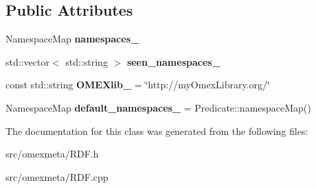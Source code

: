 \subsection*{Public Attributes}
\begin{DoxyCompactItemize}
\item 
\mbox{\label{classomexmeta_1_1RDF_a1979d7d70a4c20f2e63f00c7fa668b1f}} 
Namespace\+Map {\bfseries namespaces\+\_\+}
\item 
\mbox{\label{classomexmeta_1_1RDF_a82bc53feb93e1243970400fd104174da}} 
std\+::vector$<$ std\+::string $>$ {\bfseries seen\+\_\+namespaces\+\_\+}
\item 
\mbox{\label{classomexmeta_1_1RDF_aae58e1da72231c07cf0742f3321cebcc}} 
const std\+::string {\bfseries OMEXlib\+\_\+} = \char`\"{}http\+://my\+Omex\+Library.\+org/\char`\"{}
\item 
\mbox{\label{classomexmeta_1_1RDF_a5b1184955f2401c30116c7473be1ca1d}} 
Namespace\+Map {\bfseries default\+\_\+namespaces\+\_\+} = Predicate\+::namespace\+Map()
\end{DoxyCompactItemize}


The documentation for this class was generated from the following files\+:\begin{DoxyCompactItemize}
\item 
src/omexmeta/R\+D\+F.\+h\item 
src/omexmeta/R\+D\+F.\+cpp\end{DoxyCompactItemize}
